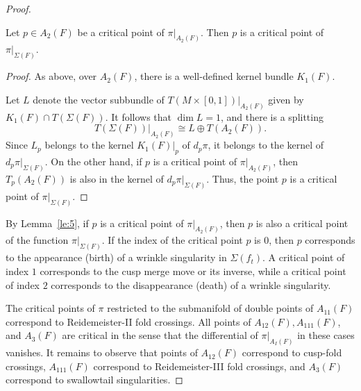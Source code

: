 \documentclass[10pt,a4paper]{amsart}
\def \R{\mathbb{R}}
\begin{document}
\begin{proof}
\begin{lemma}\label{le:5} Let $p\in A_2(F)$ be a critical point of $\pi|_{A_2(F)}$. Then $p$ is a critical point of $\pi|_{\Sigma(F)}$. 
\end{lemma}
\begin{proof}  As above, over $A_2(F)$, there is a well-defined kernel bundle $K_1(F)$. 

Let $L$ denote the vector subbundle of $T(M\times [0,1])|_{A_2(F)}$ given by $K_1(F)\cap T(\Sigma(F))$. It follows that $\dim L=1$, and there is a splitting
\[
     T(\Sigma(F))|_{A_2(F)} \cong L \oplus T(A_2(F)). 
\]
Since $L_p$ belongs to the kernel $K_1(F)|_p$ of $d_p\pi$, it belongs to the kernel of $d_p\pi|_{\Sigma(F)}$.
On the other hand, if $p$ is a critical point of $\pi|_{A_2(F)}$, then $T_p(A_2(F))$ is also in the kernel of $d_p\pi|_{\Sigma(F)}$. Thus, the point $p$ is a critical point of $\pi|_{\Sigma(F)}$. 
\end{proof}

By Lemma~\ref{le:5}, if $p$ is a critical point of $\pi|_{A_2(F)}$, then $p$ is also a critical point of the function $\pi|_{\Sigma(F)}$. If the index of the critical point $p$ is $0$, then $p$ corresponds to the appearance (birth) of a wrinkle singularity in $\Sigma(f_t)$. A critical point of index $1$ corresponds to the cusp merge move or its inverse, while a critical point of index $2$ corresponds to the disappearance (death) of a wrinkle singularity. 

The critical points of $\pi$ restricted to the submanifold of double points of $A_{11}(F)$ correspond to Reidemeister-II fold crossings. All points of $A_{12}(F), A_{111}(F)$,  and $A_{3}(F)$ are critical in the sense that the differential of $\pi|_{A_I(F)}$ in these cases vanishes. 
It remains to observe that points of $A_{12}(F)$ correspond to cusp-fold crossings,  $A_{111}(F)$ correspond to  Reidemeister-III fold crossings, and $A_3(F)$ correspond to swallowtail singularities.  
\end{proof}
\end{document}
